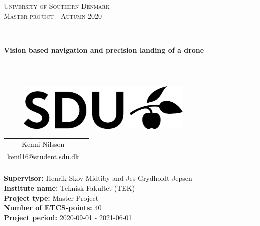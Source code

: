 \documentclass[Report.tex]{subfiles}
\begin{document}
\begin{titlepage}
\begin{center}
\textsc{\LARGE University of Southern Denmark}\\[1.5cm]

\textsc{\large Master project - Autumn 2020}\\[0.5cm]
\rule{\linewidth}{0.5mm}\\[0.2cm]
{ \LARGE \bfseries Vision based navigation and precision landing of a drone \\[0.4cm]}
\rule{\linewidth}{0.5mm}\\[1.2cm]

\vspace{2.5cm}

    \begin{figure}[h!]
    \centering
    \includegraphics[width=0.75\textwidth]{../Figures/SDUlogo.png}
    \label{fig:SDUlogo}\\
    [2.5cm]
    \end{figure}


\begin{tabular}{cc}
	\cline{1-1}
	\\
    Kenni Nilsson\\
    \href{mailto:kenil16@student.sdu.dk}{kenil16@student.sdu.dk} \\
	\\	
\end{tabular}	

\vfill

\textbf{Supervisor:} Henrik Skov Midtiby and Jes Grydholdt Jepsen \\
\textbf{Institute name:} Teknisk Fakultet (TEK) \\
\textbf{Project type:} Master Project \\
\textbf{Number of ETCS-points:} 40 \\
\textbf{Project period:} 2020-09-01 - 2021-06-01
\mbox{}\\

\end{center}
\end{titlepage}
\end{document}
